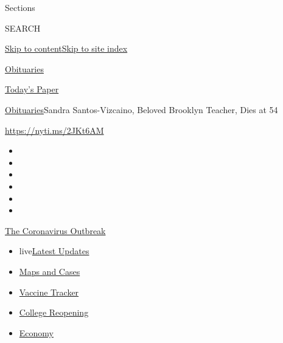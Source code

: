 Sections

SEARCH

\protect\hyperlink{site-content}{Skip to
content}\protect\hyperlink{site-index}{Skip to site index}

\href{https://www.nytimes.com/section/obituaries}{Obituaries}

\href{https://myaccount.nytimes.com/auth/login?response_type=cookie\&client_id=vi}{}

\href{https://www.nytimes.com/section/todayspaper}{Today's Paper}

\href{/section/obituaries}{Obituaries}\textbar{}Sandra Santos-Vizcaino,
Beloved Brooklyn Teacher, Dies at 54

\url{https://nyti.ms/2JKt6AM}

\begin{itemize}
\item
\item
\item
\item
\item
\item
\end{itemize}

\href{https://www.nytimes.com/news-event/coronavirus?action=click\&pgtype=Article\&state=default\&region=TOP_BANNER\&context=storylines_menu}{The
Coronavirus Outbreak}

\begin{itemize}
\tightlist
\item
  live\href{https://www.nytimes.com/2020/08/03/world/coronavirus-covid-19.html?action=click\&pgtype=Article\&state=default\&region=TOP_BANNER\&context=storylines_menu}{Latest
  Updates}
\item
  \href{https://www.nytimes.com/interactive/2020/us/coronavirus-us-cases.html?action=click\&pgtype=Article\&state=default\&region=TOP_BANNER\&context=storylines_menu}{Maps
  and Cases}
\item
  \href{https://www.nytimes.com/interactive/2020/science/coronavirus-vaccine-tracker.html?action=click\&pgtype=Article\&state=default\&region=TOP_BANNER\&context=storylines_menu}{Vaccine
  Tracker}
\item
  \href{https://www.nytimes.com/2020/08/02/us/covid-college-reopening.html?action=click\&pgtype=Article\&state=default\&region=TOP_BANNER\&context=storylines_menu}{College
  Reopening}
\item
  \href{https://www.nytimes.com/live/2020/08/03/business/stock-market-today-coronavirus?action=click\&pgtype=Article\&state=default\&region=TOP_BANNER\&context=storylines_menu}{Economy}
\end{itemize}

